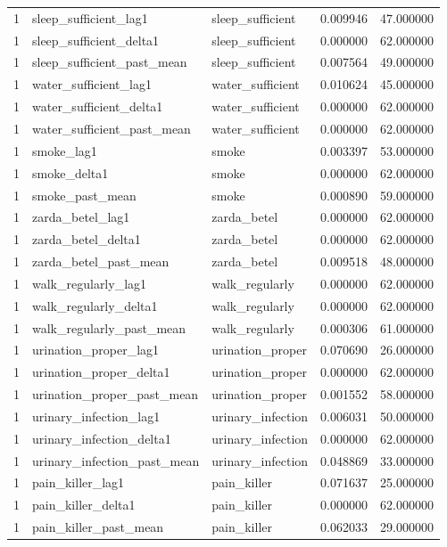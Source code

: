 \begin{longtable}{rllrr}
1 & sleep\_sufficient\_lag1 & sleep\_sufficient & 0.009946 & 47.000000 \\
1 & sleep\_sufficient\_delta1 & sleep\_sufficient & 0.000000 & 62.000000 \\
1 & sleep\_sufficient\_past\_mean & sleep\_sufficient & 0.007564 & 49.000000 \\
1 & water\_sufficient\_lag1 & water\_sufficient & 0.010624 & 45.000000 \\
1 & water\_sufficient\_delta1 & water\_sufficient & 0.000000 & 62.000000 \\
1 & water\_sufficient\_past\_mean & water\_sufficient & 0.000000 & 62.000000 \\
1 & smoke\_lag1 & smoke & 0.003397 & 53.000000 \\
1 & smoke\_delta1 & smoke & 0.000000 & 62.000000 \\
1 & smoke\_past\_mean & smoke & 0.000890 & 59.000000 \\
1 & zarda\_betel\_lag1 & zarda\_betel & 0.000000 & 62.000000 \\
1 & zarda\_betel\_delta1 & zarda\_betel & 0.000000 & 62.000000 \\
1 & zarda\_betel\_past\_mean & zarda\_betel & 0.009518 & 48.000000 \\
1 & walk\_regularly\_lag1 & walk\_regularly & 0.000000 & 62.000000 \\
1 & walk\_regularly\_delta1 & walk\_regularly & 0.000000 & 62.000000 \\
1 & walk\_regularly\_past\_mean & walk\_regularly & 0.000306 & 61.000000 \\
1 & urination\_proper\_lag1 & urination\_proper & 0.070690 & 26.000000 \\
1 & urination\_proper\_delta1 & urination\_proper & 0.000000 & 62.000000 \\
1 & urination\_proper\_past\_mean & urination\_proper & 0.001552 & 58.000000 \\
1 & urinary\_infection\_lag1 & urinary\_infection & 0.006031 & 50.000000 \\
1 & urinary\_infection\_delta1 & urinary\_infection & 0.000000 & 62.000000 \\
1 & urinary\_infection\_past\_mean & urinary\_infection & 0.048869 & 33.000000 \\
1 & pain\_killer\_lag1 & pain\_killer & 0.071637 & 25.000000 \\
1 & pain\_killer\_delta1 & pain\_killer & 0.000000 & 62.000000 \\
1 & pain\_killer\_past\_mean & pain\_killer & 0.062033 & 29.000000 \\

\end{longtable}
